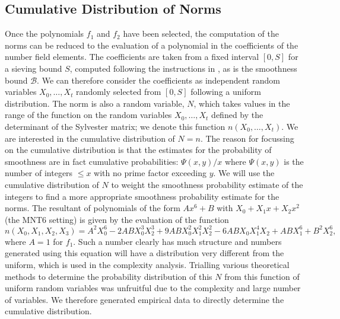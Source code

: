 \documentclass[a4paper, 10pt, envcountsect, runningheads]{article}
\numberwithin{figure}{section}
\numberwithin{equation}{section}
\begin{document}
\subsection{Cumulative Distribution of Norms}
\label{ss:norms_dist}
Once the polynomials $f_1$ and $f_2$ have been selected, the computation of the norms can be reduced to the evaluation of a polynomial in the coefficients of the number field elements. The coefficients are taken from a fixed interval $[0,S]$ for a sieving bound $S$, computed following the instructions in \cite{joux-lercier-smart-vercauteren06}, as is the smoothness bound $\mathcal{B}$. We can therefore consider the coefficients as independent random variables $X_0,\ldots,X_t$ randomly selected from $[0,S]$ following a uniform distribution. The norm is also a random variable, $N$, which takes values in the range of the function on the random variables $X_0,\ldots,X_t$ defined by the determinant of the Sylvester matrix; we denote this function $n(X_0,\ldots,X_t)$. We are interested in the cumulative distribution of $N=n$. 
The reason for focussing on the cumulative distribution is that the estimates for the probability of smoothness are in fact cumulative probabilities: $\Psi(x,y)/x$ where $\Psi(x,y)$ is the number of integers $\leq x$ with no prime factor exceeding $y$. We will use the cumulative distribution of $N$ to weight the smoothness probability estimate of the integers to find a more appropriate smoothness probability estimate for the norms.
The resultant of polynomials of the form $Ax^6+B$ with $X_0+X_1 x +X_2 x^2$ (the MNT6 setting) is given by the evaluation of the function {\small{$$n(X_0,X_1,X_2,X_3)=A^2 X_0^6 - 2 A B X_0^3 X_2^3 + 9 A B X_0^2 X_1^2 X_2^2 - 6 A B X_0 X_1^4 X_2 + ABX_1^6 + B^2 X_2^6,$$}} where $A=1$ for $f_1$. Such a number clearly has much structure and numbers generated using this equation will have a distribution very different from the uniform, which is used in the complexity analysis. Trialling various theoretical methods to determine the probability distribution of this $N$ from this function of uniform random variables was unfruitful due to the complexity and large number of variables. We therefore generated empirical data to directly determine the cumulative distribution. 
\end{document}
